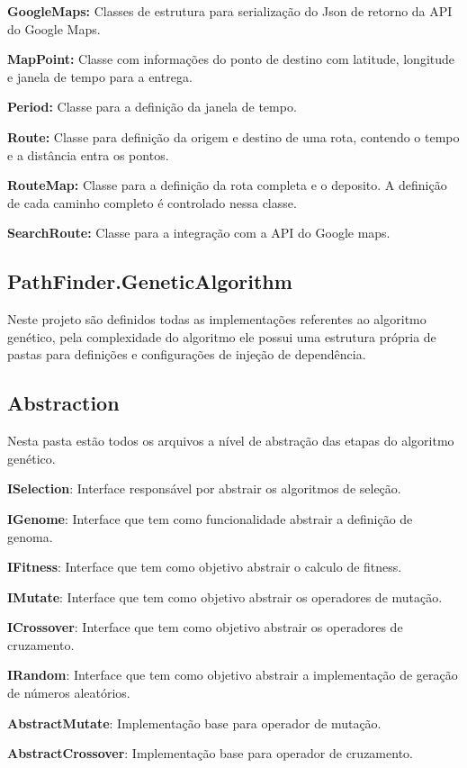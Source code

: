 \textbf{GoogleMaps:} Classes de estrutura para serialização do Json de retorno da API do Google Maps.

\textbf{MapPoint:} Classe com informações do ponto de destino com latitude, longitude e janela de tempo para a entrega.

\textbf{Period:} Classe para a definição da janela de tempo.

\textbf{Route:} Classe para definição da origem e destino de uma rota, contendo o tempo e a distância entra os pontos.

\textbf{RouteMap:} Classe para a definição da rota completa e o deposito. A definição de cada caminho completo é controlado nessa classe. 

\textbf{SearchRoute:} Classe para a integração com a API do Google maps.

\subsection{PathFinder.GeneticAlgorithm}
Neste projeto são definidos todas as implementações referentes ao algoritmo genético, pela complexidade do algoritmo ele possui uma estrutura própria de pastas para definições e configurações de injeção de dependência.

\subsection{Abstraction}

Nesta pasta estão todos os arquivos a nível de abstração das etapas do algoritmo genético.

\textbf{ISelection}: Interface responsável por abstrair os algoritmos de seleção.

\textbf{IGenome}: Interface que tem como funcionalidade abstrair a definição de genoma.

\textbf{IFitness}: Interface que tem como objetivo abstrair o calculo de fitness.

\textbf{IMutate}: Interface que tem como objetivo abstrair os operadores de mutação.

\textbf{ICrossover}:  Interface que tem como objetivo abstrair os operadores de cruzamento.

\textbf{IRandom}: Interface que tem como objetivo abstrair a implementação de geração de números aleatórios.

\textbf{AbstractMutate}: Implementação base para operador de mutação.

\textbf{AbstractCrossover}: Implementação base para operador de cruzamento.


